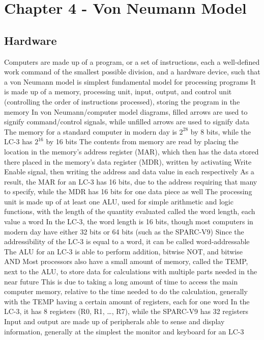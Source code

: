 \documentclass[11 pt, twoside]{article}
\newenvironment{outline*}
{
	\begin{outline}[enumerate]
	}
	{\end{outline}
}
\begin{document}
\section{Chapter 4 - Von Neumann Model}
\subsection{Hardware}
\begin{outline*}
\1 Computers are made up of a program, or a set of instructions, each a well-defined work command of the smallest possible division, and a hardware device, such that a von Neumann model is simplest fundamental model for processing programs
\2 It is made up of a memory, processing unit, input, output, and control unit (controlling the order of instructions processed), storing the program in the memory
\2 In von Neumann/computer model diagrams, filled arrows are used to signify command/control signals, while unfilled arrows are used to signify data
\1 The memory for a standard computer in modern day is $2^{28}$ by 8 bits, while the LC-3 has $2^{16}$ by 16 bits
\2 The contents from memory are read by placing the location in the memory's address register (MAR), which then has the data stored there placed in the memory's data register (MDR), written by activating Write Enable signal, then writing the address and data value in each respectively
\2 As a result, the MAR for an LC-3 has 16 bits, due to the address requiring that many to specify, while the MDR has 16 bits for one data piece as well
\1 The processing unit is made up of at least one ALU, used for simple arithmetic and logic functions, with the length of the quantity evaluated called the word length, each value a word
\2 In the LC-3, the word length is 16 bits, though most computers in modern day have either 32 bits or 64 bits (such as the SPARC-V9)
\3 Since the addressibility of the LC-3 is equal to a word, it can be called word-addressable
\2 The ALU for an LC-3 is able to perform addition, bitwise NOT, and bitwise AND
\2 Most processors also have a small amount of memory, called the TEMP, next to the ALU, to store data for calculations with multiple parts needed in the near future
\3 This is due to taking a long amount of time to access the main computer memory, relative to the time needed to  do the calculation, generally with the TEMP having a certain amount of registers, each for one word
\3 In the LC-3, it has 8 registers (R0, R1, \dots, R7), while the SPARC-V9 has 32 registers
\1 Input and output are made up of peripherals able to sense and display information, generally at the simplest the monitor and keyboard for an LC-3

\end{outline*}
\end{document}
